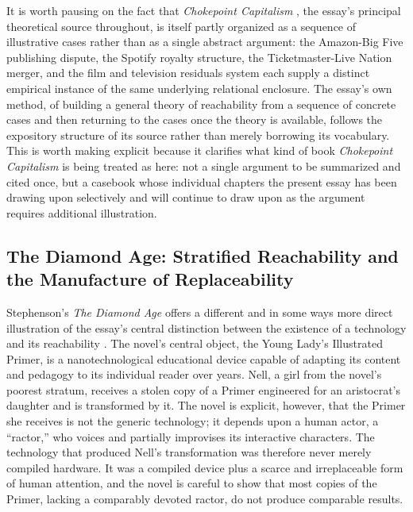 \documentclass[11pt]{article}
\begin{document}
It is worth pausing on the fact that \emph{Chokepoint Capitalism} \citep{doctorowgiblin2022chokepoint}, the essay's principal theoretical source throughout, is itself partly organized as a sequence of illustrative cases rather than as a single abstract argument: the Amazon-Big Five publishing dispute, the Spotify royalty structure, the Ticketmaster-Live Nation merger, and the film and television residuals system each supply a distinct empirical instance of the same underlying relational enclosure. The essay's own method, of building a general theory of reachability from a sequence of concrete cases and then returning to the cases once the theory is available, follows the expository structure of its source rather than merely borrowing its vocabulary. This is worth making explicit because it clarifies what kind of book \emph{Chokepoint Capitalism} is being treated as here: not a single argument to be summarized and cited once, but a casebook whose individual chapters the present essay has been drawing upon selectively and will continue to draw upon as the argument requires additional illustration.

\subsection{The Diamond Age: Stratified Reachability and the Manufacture of Replaceability}

Stephenson's \emph{The Diamond Age} offers a different and in some ways more direct illustration of the essay's central distinction between the existence of a technology and its reachability \citep{stephenson1995diamondage}. The novel's central object, the Young Lady's Illustrated Primer, is a nanotechnological educational device capable of adapting its content and pedagogy to its individual reader over years. Nell, a girl from the novel's poorest stratum, receives a stolen copy of a Primer engineered for an aristocrat's daughter and is transformed by it. The novel is explicit, however, that the Primer she receives is not the generic technology; it depends upon a human actor, a ``ractor,'' who voices and partially improvises its interactive characters. The technology that produced Nell's transformation was therefore never merely compiled hardware. It was a compiled device plus a scarce and irreplaceable form of human attention, and the novel is careful to show that most copies of the Primer, lacking a comparably devoted ractor, do not produce comparable results.
\end{document}
